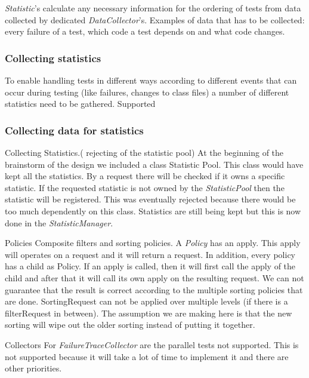 \documentclass[i2]{oss}
\newcommand{\class}[1]{\emph{#1}}
\begin{document}
\class{Statistic}'s calculate any necessary information for the ordering
of tests from data collected by dedicated \class{DataCollector}'s.
Examples of data that has to be collected: every failure of a test,
which code a test depends on and what code changes.

\subsubsection{Collecting statistics}
To enable handling tests in different ways according to different events 
that can occur during testing (like failures, changes to class files) 
a number of different statistics need to be gathered.
Supported

\subsubsection{Collecting data for statistics}





\begin{description}
\item Collecting Statistics.( rejecting of the statistic pool)
At the beginning of the brainstorm of the design we included a class {Statistic Pool}. This class would have kept all the statistics. By a request there will be checked if it owns a specific statistic. If the requested statistic is not owned by the \emph{StatisticPool} then the statistic will be registered. This was eventually rejected because there would be too much dependently on this class. Statistics are still being kept but this is now done in the \emph{StatisticManager}.

\item Policies
Composite filters and sorting policies.
A \emph{Policy} has an apply. This apply will operates on a request and it will return a request. In addition, every policy has a child as Policy. If an apply is called, then it will first call the apply of the child and after that it will call its own apply on the resulting request. We can not guarantee that the result is correct according to the multiple sorting policies that are done. SortingRequest can not be applied over multiple levels (if there is a filterRequest in between). The assumption we are making here is that the new sorting will wipe out the older sorting instead of putting it together.

\item Collectors
For \emph{FailureTraceCollector} are the parallel tests not supported. This is not supported because it will take a lot of time to implement it and there are other priorities.
\end{description}
\end{document}
